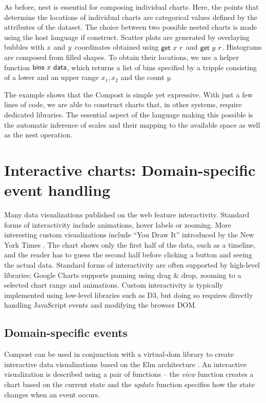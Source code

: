\documentclass{jfp}
\newcommand{\X}{\emph{x}\ }
\newcommand{\Y}{\emph{y}\ }
\newcommand{\ident}[1]{\textnormal{\textcolor{idclr}{\sffamily #1}}}
\newcommand{\kvd}[1]{\textnormal{\textcolor{kvdclr}{\sffamily #1}}}
\newcommand{\fkvd}[1]{\textnormal{\textcolor{fkvdclr}{\sffamily #1}}}
\begin{document}
\vspace{-0.5em}
\noindent
As before, \kvd{nest} is essential for composing individual charts. Here, the points that determine
the locations of individual charts are categorical values defined by the attributes of the dataset.
The choice between two possible nested charts is made using the host language \fkvd{if} construct.
Scatter plots are generated by overlaying bubbles with \X and \Y coordinates obtained using $\ident{get}~x~r$
and $\ident{get}~y~r$. Histograms are composed from filled shapes. To obtain their locations, we use
a helper function $\ident{bins}~x~\ident{data}$, which returns a list of bins specified by a tripple
consisting of a lower and an upper range $x_1, x_2$ and the count $y$.

The example shows that the Compost is simple yet expressive. With just
a few lines of code, we are able to construct charts that, in other systems, require dedicated
libraries. The essential aspect of the language making this possible is the automatic inference
of scales and their mapping to the available space as well as the \kvd{nest} operation.


\section{Interactive charts: Domain-specific event handling}
Many data visualizations published on the web feature interactivity. Standard forms of
interactivity include animations, hover labels or zooming. More interesting custom
visualizations include ``You Draw It'' introduced by the New York Times \cite{youdraw}.
The chart shows only the first half of the data, such as a timeline, and the reader has to
guess the second half before clicking a button and seeing the actual data. Standard forms of
interactivity are often supported by high-level libraries; Google Charts supports panning
using drag \& drop, zooming to a selected chart range and animations. Custom interactivity is
typically implemented using low-level libraries such as D3, but doing so requires directly handling
JavaScript events and modifying the browser DOM.

\subsection{Domain-specific events}
Compost can be used in conjunction with a virtual-dom library to create interactive data
visualizations based on the Elm architecture \cite{mvu}. An interactive visualization is described using
a pair of functions -- the \emph{view} function creates a chart based on the current state and
the \emph{update} function specifies how the state changes when an event occurs.
\end{document}
